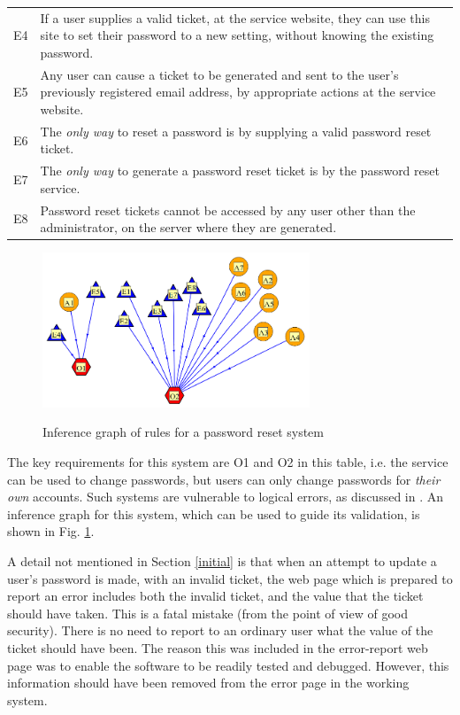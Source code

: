 \begin{table}[tb]
\begin{center}
\begin{tabular}{|c|p{9cm}|}
E4 & If a user supplies a valid ticket, at the service website, they can use this site to set their password to 
a new setting, without knowing the existing password.\\
E5 & Any user can cause a ticket to be generated and sent to the user's previously registered email address, by 
appropriate actions at the service website.\\
E6 & The {\em only way} to reset a password is by supplying a valid password reset ticket.\\
E7 & The {\em only way} to generate a password reset ticket is by the password
reset service.\\
E8 & Password reset tickets cannot be accessed by any user other than the administrator, on the server
where they are generated.\\
\hline
\end{tabular}
\end{center}
\end{table}

\begin{figure}[bhpt]
	\begin{centering}
		\leavevmode\includegraphics[width=8cm]{figures/pwreset.png}\ \\
		\caption{Inference graph of rules for a password reset system}\label{pwresetrules}
	\end{centering}
\end{figure}

The key requirements for this system are O1 and O2 in this table, i.e. the service can be used to change passwords, but users can only change passwords for {\em their own} accounts. Such systems are vulnerable to logical errors, as discussed in \cite{exptsandproofs}. An inference graph for this system, which can be used to guide its validation, is shown in Fig. \ref{pwresetrules}.


\iffalse
A detail not mentioned in Section \ref{initial} is that when an attempt
to update a user's password is made, with an invalid ticket, the web 
page which is prepared to report an error includes both the invalid
ticket, and the value that the ticket should have taken. This is a fatal
mistake (from the point of view of good security). There is no need
to report to an ordinary user what the value of the ticket should
have been. The reason this was included in the error-report web page
was to enable the software to be readily tested and debugged. However,
this information should have been removed from the error page
in the working system.

